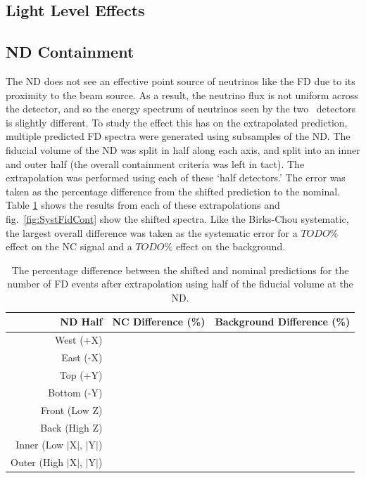 \subsection{Light Level Effects}

\subsection{ND Containment}

The ND does not see an effective point source of neutrinos like the FD due to its proximity to the beam source. As a result, the neutrino flux is not uniform across the detector, and so the energy spectrum of neutrinos seen by the two \nova~detectors is slightly different. To study the effect this has on the extrapolated prediction, multiple predicted FD spectra were generated using subsamples of the ND. The fiducial volume of the ND was split in half along each axis, and split into an inner and outer half (the overall containment criteria was left in tact). The extrapolation was performed using each of these `half detectors.' The error was taken as the percentage difference from the shifted prediction to the nominal. Table \ref{tab:SystFidCont} shows the results from each of these extrapolations and fig.~\ref{fig:SystFidCont} show the shifted spectra. Like the Birks-Chou systematic, the largest overall difference was taken as the systematic error for a $TODO\%$ effect on the NC signal and a $TODO\%$ effect on the background.
\begin{table}[h]
  \begin{center}
    \caption[ND Containment Systematic Errors]{The percentage difference between the shifted and nominal predictions for the number of FD events after extrapolation using half of the fiducial volume at the ND.}
    \label{tab:SystFidCont}
    \begin{tabular}{r c c}
      \hline\hline
      ND Half & NC Difference (\%) & Background Difference (\%) \\
      \hline
      West (+X) & & \\
      East (-X) & & \\
      Top (+Y) & & \\
      Bottom (-Y) & & \\
      Front (Low Z) & & \\
      Back (High Z) & & \\
      Inner (Low $\vert$X$\vert$, $\vert$Y$\vert$) & & \\
      Outer (High $\vert$X$\vert$, $\vert$Y$\vert$) & & \\
      \hline
    \end{tabular}
  \end{center}
\end{table}

